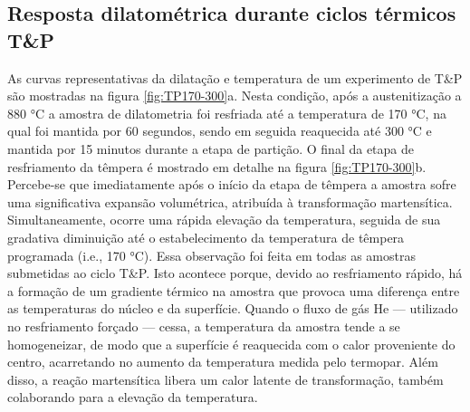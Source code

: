 \subsection{Resposta dilatom\'{e}trica durante ciclos t\'{e}rmicos T\&P}

As curvas representativas da dilatação e temperatura de um experimento de T\&P são mostradas na figura \ref{fig:TP170-300}a. Nesta condição, após a austenitização a 880 °C a amostra de dilatometria foi resfriada até a temperatura de 170 °C, na qual foi mantida por 60 segundos, sendo em seguida reaquecida até 300 °C e mantida por 15 minutos durante a etapa de partição. O final da etapa de resfriamento da têmpera é mostrado em detalhe na figura \ref{fig:TP170-300}b. Percebe-se que imediatamente após o início da etapa de têmpera a amostra sofre uma significativa expansão volumétrica, atribuída à transformação martensítica. Simultaneamente, ocorre uma rápida elevação da temperatura, seguida de sua gradativa diminuição até o estabelecimento da temperatura de têmpera programada (i.e., 170 °C). Essa observação foi feita em todas as amostras submetidas ao ciclo T\&P. Isto acontece porque, devido ao resfriamento rápido, há a formação de um gradiente térmico na amostra que provoca uma diferença entre as temperaturas do núcleo e da superfície. Quando o fluxo de gás He --- utilizado no resfriamento forçado --- cessa, a temperatura da amostra tende a se homogeneizar, de modo que a superfície é reaquecida com o calor proveniente do centro, acarretando no aumento da temperatura medida pelo termopar. Além disso, a reação martensítica libera um calor latente de transformação, também colaborando para a elevação da temperatura.


